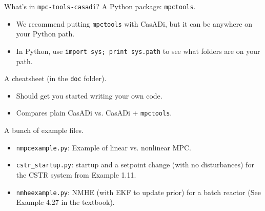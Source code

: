 \documentclass[xcolor=dvipsnames]{beamer}
\begin{document}
\begin{frame}{What's in \texttt{mpc-tools-casadi}?}
    A Python package: \texttt{mpctools}.
    \begin{itemize}
        \item We recommend putting \texttt{mpctools} with CasADi, but it can be anywhere on your Python path.
        \item In Python, use \lstinline[style=python]!import sys; print sys.path! to see what folders are on your path.
    \end{itemize}
    
    \medskip
    
    A cheatsheet (in the \texttt{doc} folder).
    \begin{itemize}
        \item Should get you started writing your own code.
        \item Compares plain CasADi vs. CasADi + \texttt{mpctools}.
    \end{itemize}
    
    \medskip
    
    A bunch of example files.
    \begin{itemize}
        \item \texttt{nmpcexample.py}: Example of linear vs. nonlinear MPC.
        \item \texttt{cstr\_startup.py}: startup and a setpoint change (with no disturbances) for the CSTR system from Example 1.11.
        \item \texttt{nmheexample.py}: NMHE (with EKF to update prior) for a batch reactor (See Example 4.27 in the textbook).
    \end{itemize}
\end{frame}
\end{document}
